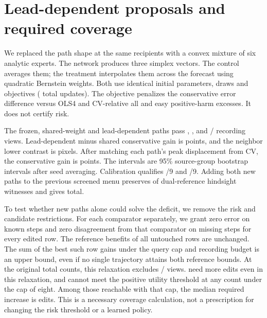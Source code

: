 \section{Lead-dependent proposals and required coverage}
We replaced the path shape at the same \LeadMixEdits{} recipients with
a convex mixture of six analytic experts. The network produces three
simplex vectors. The control averages them; the treatment interpolates
them across the forecast using quadratic Bernstein weights. Both use
identical initial parameters, draws and objectives
(\LeadMixUpdates{} total updates). The objective penalizes the
conservative error difference versus OLS4 and CV-relative
all and easy positive-harm excesses. It does not certify risk.

The frozen, shared-weight and lead-dependent paths pass
\LeadMixFrozen{}, \LeadMixShared{}, and \LeadMixLead{}/\LeadMixViews{}
recording views. Lead-dependent minus shared conservative gain is
\LeadMixLeadContrast{} points, and the neighbor lower contrast is
\LeadMixLeadPair{} pixels. After matching each path's peak displacement
from CV, the conservative gain is \LeadMixShape{} points. The intervals
are 95\% source-group bootstrap intervals after seed averaging.
Calibration qualifies \LeadMixSharedQual{}/9 and \LeadMixLeadQual{}/9.
Adding both new paths to the previous screened menu preserves
\LeadMixCapacityBefore{} of \LeadMixViews{} dual-reference hindsight
witnesses and gives \LeadMixCapacityAfter{} total.

To test whether new paths alone could solve the deficit, we remove
the risk and candidate restrictions. For each comparator separately,
we grant zero error on known steps and zero disagreement from that
comparator on missing steps for every edited row. The reference
benefits of all untouched rows are unchanged. The sum of the best
such row gains under the query cap and recording budget is an upper
bound, even if no single trajectory attains both reference bounds.
At the original total counts, this relaxation excludes
\LeadMixExcluded{}/\LeadMixViews{} views. \LeadMixNeedMore{} need more
edits even in this relaxation, and \LeadMixUnreachable{} cannot meet
the positive utility threshold at any count under the cap of eight.
Among those reachable with that cap, the median required increase is
\LeadMixExtra{} edits. This is a necessary coverage calculation, not a
prescription for changing the risk threshold or a learned policy.
